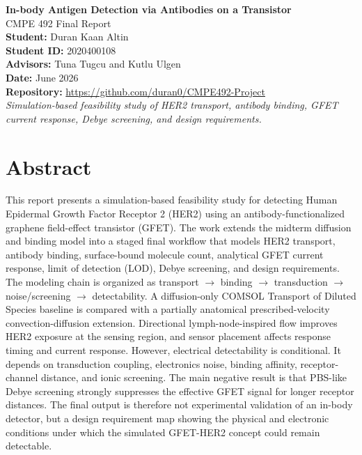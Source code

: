 ﻿\documentclass[12pt,a4paper,oneside]{report}
\begin{document}
\begin{titlepage}
\centering
\vspace*{1.6cm}
{\Huge\textbf{In-body Antigen Detection via Antibodies on a Transistor}}\\[0.8cm]
{\Large CMPE 492 Final Report}\\[1.2cm]
\textbf{Student:} Duran Kaan Altin\\
\textbf{Student ID:} 2020400108\\
\textbf{Advisors:} Tuna Tugcu and Kutlu Ulgen\\
\textbf{Date:} June 2026\\
\textbf{Repository:} \url{https://github.com/duran0/CMPE492-Project}\\[1.4cm]
\vfill
\textit{Simulation-based feasibility study of HER2 transport, antibody binding, GFET current response, Debye screening, and design requirements.}
\end{titlepage}

\chapter*{Abstract}
This report presents a simulation-based feasibility study for detecting Human Epidermal Growth Factor Receptor 2 (HER2) using an antibody-functionalized graphene field-effect transistor (GFET). The work extends the midterm diffusion and binding model into a staged final workflow that models HER2 transport, antibody binding, surface-bound molecule count, analytical GFET current response, limit of detection (LOD), Debye screening, and design requirements. The modeling chain is organized as transport $\rightarrow$ binding $\rightarrow$ transduction $\rightarrow$ noise/screening $\rightarrow$ detectability. A diffusion-only COMSOL Transport of Diluted Species baseline is compared with a partially anatomical prescribed-velocity convection-diffusion extension. Directional lymph-node-inspired flow improves HER2 exposure at the sensing region, and sensor placement affects response timing and current response. However, electrical detectability is conditional. It depends on transduction coupling, electronics noise, binding affinity, receptor-channel distance, and ionic screening. The main negative result is that PBS-like Debye screening strongly suppresses the effective GFET signal for longer receptor distances. The final output is therefore not experimental validation of an in-body detector, but a design requirement map showing the physical and electronic conditions under which the simulated GFET-HER2 concept could remain detectable.
\end{document}
